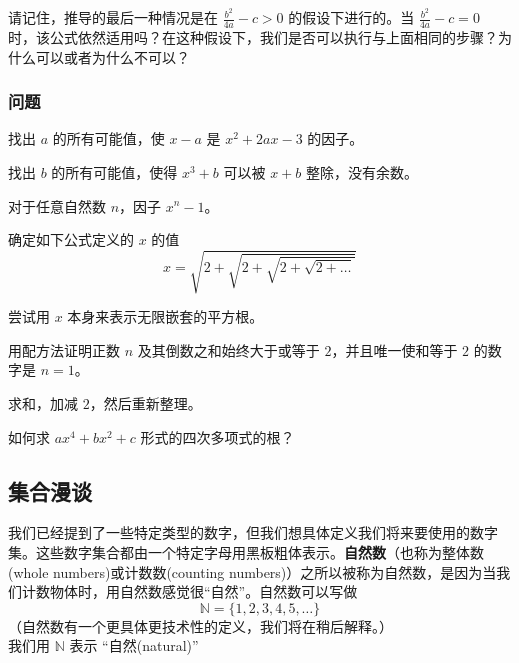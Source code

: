 请记住，推导的最后一种情况是在 $\frac{b^2}{4a} -c > 0$ 的假设下进行的。当 $\frac{b^2}{4a} -c = 0$ 时，该公式依然适用吗？在这种假设下，我们是否可以执行与上面相同的步骤？为什么可以或者为什么不可以？

\subsubsection*{问题}

\begin{problem}
    找出 $a$ 的所有可能值，使 $x-a$ 是 $x^2+2ax-3$ 的因子。
\end{problem}
\begin{problem}
    找出 $b$ 的所有可能值，使得 $x^3 + b$ 可以被 $x + b$ 整除，没有余数。
\end{problem}
\begin{problem}
    对于任意自然数 $n$，因子 $x^n - 1$。
\end{problem}
\begin{problem}
    确定如下公式定义的 $x$ 的值
    \[x = \sqrt{2+\sqrt{2+\sqrt{2+\sqrt{2+\dots}}}}\]
    \begin{hint}
        尝试用 $x$ 本身来表示无限嵌套的平方根。
    \end{hint}
\end{problem}
\begin{problem}
    用配方法证明正数 $n$ 及其倒数之和始终大于或等于 $2$，并且唯一使和等于 $2$ 的数字是 $n = 1$。
    \begin{hint}
        求和，加减 $2$，然后重新整理。
    \end{hint}
\end{problem}
\begin{problem}
    如何求 $ax^4 + bx^2 + c$ 形式的四次多项式的根？
\end{problem}

\subsection{集合漫谈}

我们已经提到了一些特定类型的数字，但我们想具体定义我们将来要使用的数字集。这些数字集合都由一个特定字母用黑板粗体表示。\textbf{自然数}（也称为整体数(whole numbers)或计数数(counting numbers)）之所以被称为自然数，是因为当我们计数物体时，用自然数感觉很“自然”。自然数可以写做
\[\mathbb{N} = \{1, 2, 3, 4, 5, \dots\}\]
（自然数有一个更具体更技术性的定义，我们将在稍后解释。）\\
我们用 $\mathbb{N}$ 表示 “自然(natural)”

